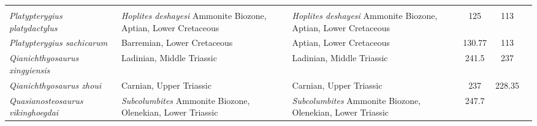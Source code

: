 \begin{longtabu}{>{\itshape}lXXSSl}
                                                             & \cite{Kolb2009PAP} \\                       
	Platypterygius platydactylus                         & \emph{Hoplites
        deshayesi} Ammonite Biozone, Aptian, Lower Cretaceous
                                                             & \emph{Hoplites
        deshayesi} Ammonite Biozone, Aptian, Lower Cretaceous
                                                             & 125
                                                             & 113
                                                             &
                                                             \cite{Broili1908NJFMGPB} \\                     
	Platypterygius sachicarum                            & Barremian, Lower
        Cretaceous
                                                             & Aptian, Lower
        Cretaceous
                                                             & 130.77
                                                             & 113
                                                             &
                                                             \cite{Paramo1997RI} \\                     
	Qianichthyosaurus xingyiensis                        & Ladinian, Middle
        Triassic
                                                             & Ladinian, Middle
        Triassic
                                                             & 241.5
                                                             & 237
                                                             &
                                                             \cite{Yang2013ASNUP} \\                       
	Qianichthyosaurus zhoui                              & Carnian, Upper
        Triassic
                                                             & Carnian, Upper
        Triassic
                                                             & 237
                                                             & 228.35
                                                             & \cite{Li1999CSB} \\                         
	Quasianosteosaurus vikinghoegdai                     &
        \emph{Subcolumbites} Ammonite Biozone, Olenekian, Lower Triassic
                                                             &
        \emph{Subcolumbites} Ammonite Biozone, Olenekian, Lower Triassic
                                                             & 247.7

\end{longtabu}
